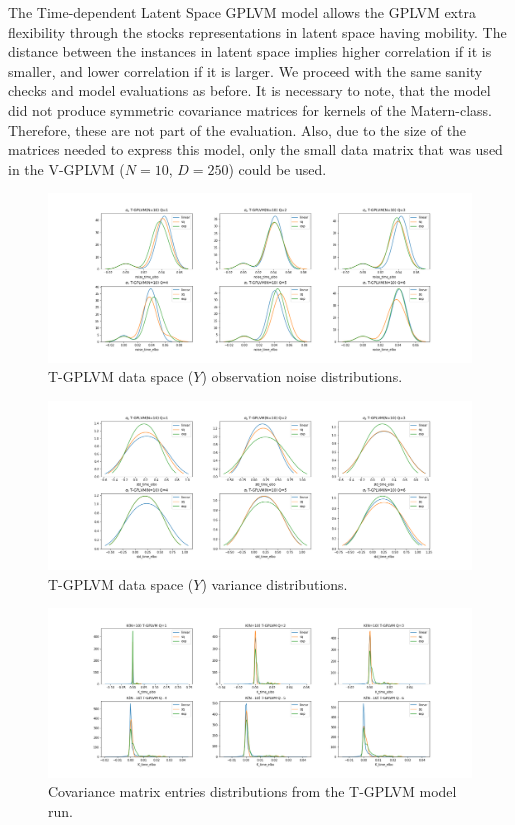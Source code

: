 The Time-dependent Latent Space GPLVM model allows the GPLVM extra flexibility through the stocks representations in latent space having mobility. The distance between the instances in latent space implies higher correlation if it is smaller, and lower correlation if it is larger. We proceed with the same sanity checks and model evaluations as before. It is necessary to note, that the model did not produce symmetric covariance matrices for kernels of the Matern-class. Therefore, these are not part of the evaluation. Also, due to the size of the matrices needed to express this model, only the small data matrix that was used in the V-GPLVM ($N=10$, $D=250$) could be used. 
\begin{figure}[t]
	\centering
	\includegraphics[width=7in]{img/07_3/noise_time_elbo.png}
	\caption[T-GPLVM noise distributions]{T-GPLVM data space ($Y$) observation noise distributions.}
	\label{fig:tgplvm_noise}
\end{figure}
\begin{figure}[b]
	\centering
	\includegraphics[width=7in]{img/07_3/std_time_elbo.png}
	\caption[T-GPLVM variance distributions]{T-GPLVM data space ($Y$) variance distributions.}
	\label{fig:tgplvm_variance}
\end{figure}
\begin{figure}[t]
	\centering
	\includegraphics[width=7in]{img/07_3/K_time_elbo.png}
	\caption[T-GPLVM covariance matrix entries distributions]{Covariance matrix entries distributions from the T-GPLVM model run.}
	\label{fig:tgplvm_covariance}
\end{figure}
